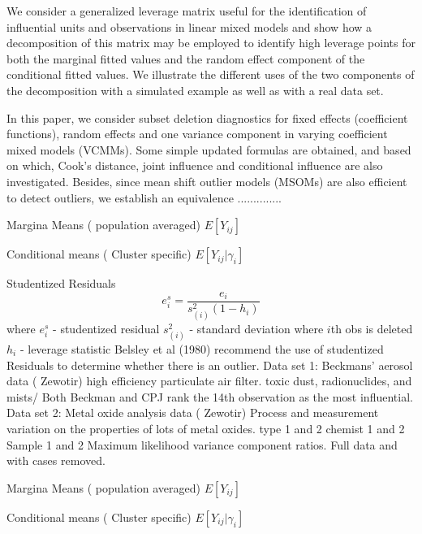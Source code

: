 \documentclass[12pt, a4paper]{article}
\begin{document}

\newpage
\begin{framed}
	We consider a generalized leverage matrix useful for the identification of influential units and observations in linear mixed models and show how a decomposition of this matrix may be employed to identify high leverage points for both the marginal fitted values and the random effect component of the conditional fitted values. We illustrate the different uses of the two components of the decomposition with a simulated example as well as with a real data set.\citet{nobresinger}
\end{framed}	
\begin{framed}
In this paper, we consider subset deletion diagnostics for fixed effects (coefficient functions), 
random effects and one variance component in varying coefficient mixed models (VCMMs). 
Some simple updated formulas are obtained, and based on which, Cook's distance, joint 
influence and conditional influence are also investigated. Besides, since mean shift outlier 
models (MSOMs) are also efficient to detect outliers, we establish an equivalence ..............
\citep{li2009influence}

\end{framed}

Margina Means ( population averaged)
$E[Y_{ij}]$

Conditional means ( Cluster specific)
$E[Y_{ij}|\gamma_{i}]$

\newpage
Studentized Residuals
\[ e^s_i = \frac{e_i}{s^2_{(i)}(1-h_i)} \]
where
$e^s_i $ - studentized residual
$s^2_{(i)}$ - standard deviation where $i$th obs is deleted
$h_i$ - leverage statistic
Belsley et al (1980) recommend the use of studentized Residuals to determine whether there is an outlier.
Data set 1: Beckmans' aerosol data ( Zewotir)
high efficiency particulate air filter.
toxic dust, radionuclides, and mists/
Both Beckman and CPJ rank the 14th observation as the most influential.
Data set 2: Metal oxide analysis data ( Zewotir)
Process and measurement variation on the properties of lots of metal oxides.
type 1 and 2
chemist 1 and 2
Sample 1 and 2
Maximum likelihood variance component ratios.
Full data and with cases removed.


Margina Means ( population averaged)
$E[Y_{ij}]$

Conditional means ( Cluster specific)
$E[Y_{ij}|\gamma_{i}]$






\end{document}
